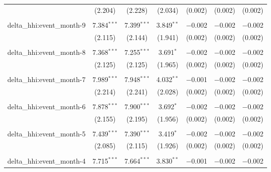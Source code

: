 \begin{table}[H]
{\begin{tabular}{@{\extracolsep{5pt}}lcccccc}
   & (2.204) & (2.228) & (2.034) & (0.002) & (0.002) & (0.002) \\  

   & & & & & & \\  

  delta\_hhi:event\_month-9 & 7.384$^{***}$ & 7.399$^{***}$ & 3.849$^{**}$ & $-$0.002 & $-$0.002 & $-$0.002 \\  

   & (2.115) & (2.144) & (1.941) & (0.002) & (0.002) & (0.002) \\  

   & & & & & & \\  

  delta\_hhi:event\_month-8 & 7.368$^{***}$ & 7.255$^{***}$ & 3.691$^{*}$ & $-$0.002 & $-$0.002 & $-$0.002 \\  

   & (2.125) & (2.125) & (1.965) & (0.002) & (0.002) & (0.002) \\  

   & & & & & & \\  

  delta\_hhi:event\_month-7 & 7.989$^{***}$ & 7.948$^{***}$ & 4.032$^{**}$ & $-$0.001 & $-$0.002 & $-$0.002 \\  

   & (2.214) & (2.241) & (2.028) & (0.002) & (0.002) & (0.002) \\  

   & & & & & & \\  

  delta\_hhi:event\_month-6 & 7.878$^{***}$ & 7.900$^{***}$ & 3.692$^{*}$ & $-$0.002 & $-$0.002 & $-$0.002 \\  

   & (2.155) & (2.195) & (1.956) & (0.002) & (0.002) & (0.002) \\  

   & & & & & & \\  

  delta\_hhi:event\_month-5 & 7.439$^{***}$ & 7.390$^{***}$ & 3.419$^{*}$ & $-$0.002 & $-$0.002 & $-$0.002 \\  

   & (2.085) & (2.115) & (1.926) & (0.002) & (0.002) & (0.002) \\  

   & & & & & & \\  

  delta\_hhi:event\_month-4 & 7.715$^{***}$ & 7.664$^{***}$ & 3.830$^{**}$ & $-$0.001 & $-$0.002 & $-$0.002 \\  


\end{tabular}}
\end{table}
